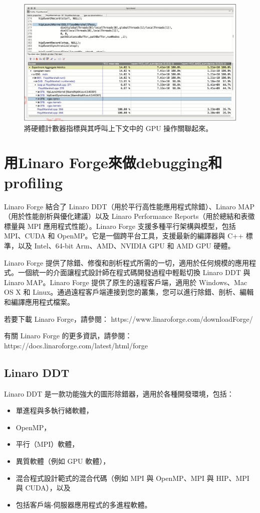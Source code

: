 \begin{figure}
    \centering
    \includegraphics[width=0.9\linewidth]{FileAusiliari/Screenshots/Figure13-29.png}
    \caption{將硬體計數器指標與其呼叫上下文中的 GPU 操作關聯起來。}
    \label{fig:PAPI29}
\end{figure}

\section{用Linaro Forge來做debugging和profiling}

Linaro Forge 結合了 Linaro DDT（用於平行高性能應用程式除錯）、Linaro MAP（用於性能剖析與優化建議）以及 Linaro Performance Reports（用於總結和表徵標量與 MPI 應用程式性能）。Linaro Forge 支援多種平行架構與模型，包括 MPI、CUDA 和 OpenMP。它是一個跨平台工具，支援最新的編譯器與 C++ 標準，以及 Intel、64-bit Arm、AMD、NVIDIA GPU 和 AMD GPU 硬體。

Linaro Forge 提供了除錯、修復和剖析程式所需的一切，適用於任何規模的應用程式。一個統一的介面讓程式設計師在程式碼開發過程中輕鬆切換 Linaro DDT 與 Linaro MAP。Linaro Forge 提供了原生的遠程客戶端，適用於 Windows、Mac OS X 和 Linux。通過遠程客戶端連接到您的叢集，您可以進行除錯、剖析、編輯和編譯應用程式檔案。

若要下載 Linaro Forge，請參閱：
https://www.linaroforge.com/downloadForge/

有關 Linaro Forge 的更多資訊，請參閱：
https://docs.linaroforge.com/latest/html/forge

\subsection{Linaro DDT}

Linaro DDT 是一款功能強大的圖形除錯器，適用於各種開發環境，包括：
\begin{itemize}
    \item 單進程與多執行緒軟體，
    \item OpenMP，
    \item 平行（MPI）軟體，
    \item 異質軟體（例如 GPU 軟體），
    \item 混合程式設計範式的混合代碼（例如 MPI 與 OpenMP、MPI 與 HIP、MPI 與 CUDA），以及
    \item 包括客戶端-伺服器應用程式的多進程軟體。
\end{itemize}

